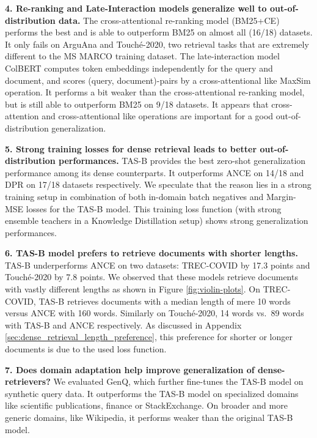\documentclass{article}
\begin{document}
\textbf{4. Re-ranking and Late-Interaction models generalize well to out-of-distribution data.} The cross-attentional re-ranking model (BM25+CE) performs the best and is able to outperform BM25 on almost all (16/18) datasets. It only fails on ArguAna and Touch\'e-2020, two retrieval tasks that are extremely different to the MS MARCO training dataset. The late-interaction model ColBERT computes token embeddings independently for the query and document, and scores (query, document)-pairs by a cross-attentional like MaxSim operation. It performs a bit weaker than the cross-attentional re-ranking model, but is still able to  outperform BM25 on 9/18 datasets. It appears that cross-attention and cross-attentional like operations are important for a good out-of-distribution generalization.


\textbf{5. Strong training losses for dense retrieval leads to better out-of-distribution performances.} TAS-B provides the best zero-shot generalization performance among its dense counterparts. It outperforms ANCE on 14/18 and DPR on 17/18 datasets respectively. We speculate that the reason lies in a strong training setup in combination of both in-domain batch negatives and Margin-MSE losses for the TAS-B model. This training loss function (with strong ensemble teachers in a Knowledge Distillation setup) shows strong generalization performances.

\textbf{6. TAS-B model prefers to retrieve documents with shorter lengths.} TAS-B underperforms ANCE on two datasets: TREC-COVID by 17.3 points and Touch\'e-2020 by 7.8 points. We observed that these  models retrieve documents with vastly different lengths as shown in Figure \ref{fig:violin-plots}. On TREC-COVID, TAS-B retrieves documents with a median length of mere 10 words versus ANCE with 160 words. Similarly on Touch\'e-2020, 14 words vs.\ 89 words with TAS-B and ANCE respectively. As discussed in Appendix \ref{sec:dense_retrieval_length_preference}, this preference for shorter or longer documents is due to the used loss function. 

\textbf{7. Does domain adaptation help improve generalization of dense-retrievers?} We evaluated GenQ, which further fine-tunes the TAS-B model on synthetic query data. It outperforms the TAS-B model on specialized domains like scientific publications, finance or StackExchange. On broader and more generic domains, like Wikipedia, it performs weaker than the original TAS-B model.
\end{document}
